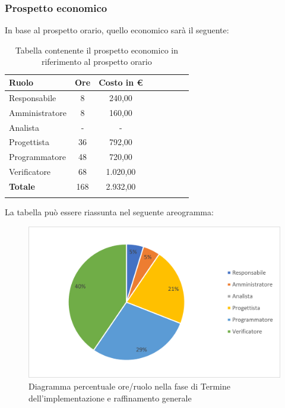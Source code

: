 			\subsubsection{Prospetto economico}
			In base al prospetto orario, quello economico sarà il seguente: 
			
			\begin{longtable}{|l|c|c|c|c|c|c|c|}
				\hline
				\rowcolor{lighter-grayer}
				\textbf{Ruolo} & \textbf{Ore} & \textbf{Costo in €} \\
				\hline
				\endfirsthead
				
				\hline
				Responsabile & 8 & 240,00\\
				\hline
				\hline
				Amministratore & 8 & 160,00\\
				\hline
				\hline
				Analista & - & -\\
				\hline
				\hline
				Progettista & 36 & 792,00\\
				\hline
				\hline
				Programmatore & 48 & 720,00\\
				\hline
				\hline
				Verificatore & 68 & 1.020,00\\
				\hline
				\hline
				\textbf{Totale} & 168 & 2.932,00\\
				\hline
				\rowcolor{white}
				\caption{Tabella contenente il prospetto economico in riferimento al prospetto orario}
			\end{longtable}
			\pagebreak
		
			La tabella può essere riassunta nel seguente areogramma:
			\begin{figure}[H]
				\centering
				\includegraphics[width=0.8\linewidth]{res/images/preventivo/6-2.png}
				\caption{Diagramma percentuale ore/ruolo nella fase di Termine dell'implementazione e raffinamento generale}
				\label{fig:diagramma costi ruolo fase Termine dell'implementazione e raffinamento generale}
            \end{figure}

